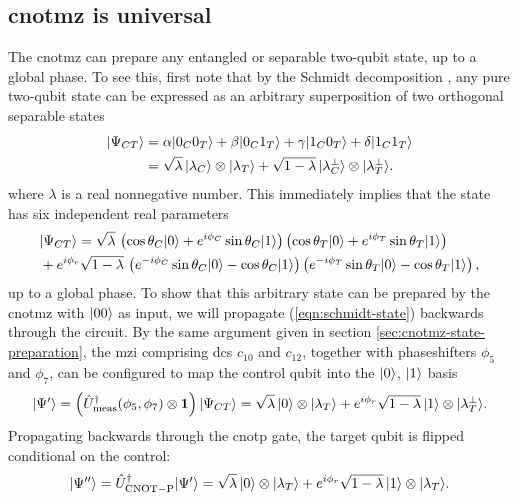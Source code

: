 \subsection{\acrshort{cnotmz} is universal}
\label{sec:arbitrary-two-qubit}
The \gls{cnotmz} can prepare any entangled or separable two-qubit state, up to a global phase.
To see this, first note that by the Schmidt decomposition \cite{Nielsen2004}, any pure two-qubit state can be expressed as an arbitrary superposition of two orthogonal separable states
\begin{align}
  \mbox{$ | \Psi_{CT} \rangle $} &= \alpha\mbox{$ | 0_C0_T \rangle $} + \beta \mbox{$ | 0_C1_T \rangle $} +\gamma \mbox{$ | 1_C0_T \rangle $} + \delta\mbox{$ | 1_C1_T \rangle $} \\
  &= \sqrt{\lambda} \, \mbox{$ | \lambda_C \rangle $} \otimes \mbox{$ | \lambda_T  \rangle $}
  + \sqrt{1-\lambda} \, \mbox{$ | \lambda_C ^ \perp \rangle $} \otimes \mbox{$ | \lambda_T ^ \perp \rangle $}.
  \label{eqn:schmidt-state}
\end{align}
where $\lambda$ is a real nonnegative number. 
This immediately implies that the state has six independent real parameters
\begin{align}
   &\mbox{$ | \Psi_{CT} \rangle $}  =  
   \sqrt{\lambda} \, 
   \left( \cos \theta_C \mbox{$ | 0 \rangle $} + e^{i\phi_C} \sin \theta_C \mbox{$ | 1 \rangle $} \right)
   \left( \cos \theta_T \mbox{$ | 0 \rangle $} + e^{i\phi_T} \sin \theta_T \mbox{$ | 1 \rangle $} \right)\\
   &+
   e^{i \phi_r}
   \sqrt{1-\lambda} \, 
   \left( e^{-i\phi_C} \sin \theta_C \mbox{$ | 0 \rangle $} - \cos \theta_C \mbox{$ | 1 \rangle $} \right)
   \left( e^{-i\phi_T} \sin \theta_T \mbox{$ | 0 \rangle $} - \cos \theta_T \mbox{$ | 1 \rangle $} \right),
\end{align}
up to a global phase.
To show that this arbitrary state can be prepared by the \gls{cnotmz} with $\mbox{$ | 00 \rangle $}$ as input, we will propagate (\ref{eqn:schmidt-state}) backwards through the circuit. By the same argument given in section \ref{sec:cnotmz-state-preparation}, the \gls{mzi} comprising \glspl{dc} $c_{10}$  and $c_{12}$, together with phaseshifters $\phi_5$ and $\phi_7$, can be configured to map the control qubit into the $\mbox{$ | 0 \rangle $}$, $\mbox{$ | 1 \rangle $}$ basis 
\begin{equation}
   \mbox{$ | \Psi' \rangle $} = 
   \left( 
   \hat{U}_\mathrm{meas}^\dagger(\phi_5, \phi_7) 
   \otimes 
   \mathbf{1} 
   \right) \mbox{$ | \Psi_{CT} \rangle $}  
    = \sqrt{\lambda} \, \mbox{$ | 0 \rangle $} \otimes \mbox{$ | \lambda_T \rangle $} 
    + e^{i \phi_r}\sqrt{1-\lambda} \, \mbox{$ | 1 \rangle $} \otimes \mbox{$ | \lambda_T^\perp \rangle $}.
\end{equation}
Propagating backwards through the \gls{cnotp} gate, the target qubit is flipped conditional on the control:
\begin{equation}
   \mbox{$ | \Psi'' \rangle $} = \hat{U}_\mathrm{CNOT-P}^\dagger \mbox{$ | \Psi' \rangle $}  
    = \sqrt{\lambda} \, \mbox{$ | 0 \rangle $} \otimes \mbox{$ | \lambda_T \rangle $} 
    + e^{i \phi_r}\sqrt{1-\lambda} \, \mbox{$ | 1 \rangle $} \otimes \mbox{$ | \lambda_T \rangle $}.
\end{equation}
